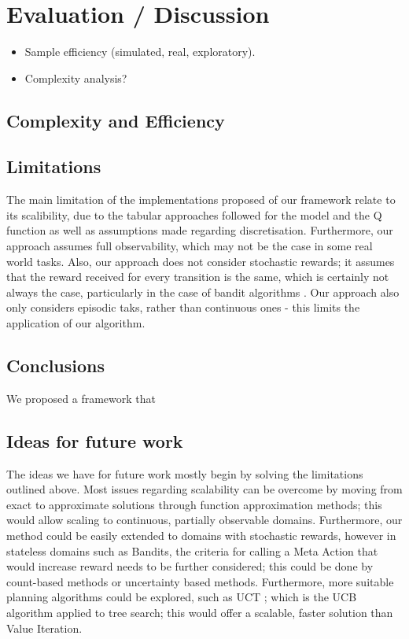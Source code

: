 \chapter{Evaluation / Discussion}
\label{chapter6}
\begin{itemize}
    \item Sample efficiency (simulated, real, exploratory).
    \item Complexity analysis?
\end{itemize}
\section{Complexity and Efficiency}
\section{Limitations}
The main limitation of the implementations proposed of our framework relate to its scalibility, due to the tabular approaches followed for the model and the Q function as well as assumptions made regarding discretisation. Furthermore, our approach assumes full observability, which may not be the case in some real world tasks. Also, our approach does not consider stochastic rewards; it assumes that the reward received for every transition is the same, which is certainly not always the case, particularly in the case of bandit algorithms \citep{lattimore}. Our approach also only considers episodic taks, rather than continuous ones - this limits the application of our algorithm.
\section{Conclusions}
We proposed a framework that 
\section{Ideas for future work}
The ideas we have for future work mostly begin by solving the limitations outlined above. Most issues regarding scalability can be overcome by moving from exact to approximate solutions through function approximation methods; this would allow scaling to continuous, partially  observable domains. Furthermore, our method could be easily extended to domains with stochastic rewards, however in stateless domains such as Bandits, the criteria for calling a Meta Action that would increase reward needs to be further considered; this could be done by count-based methods or uncertainty based methods. Furthermore, more suitable planning algorithms could be explored, such as UCT \citep{10.1007/11871842_29}; which is the UCB algorithm \citep{auer2002finite} applied to tree search; this would offer a scalable, faster solution than Value Iteration.